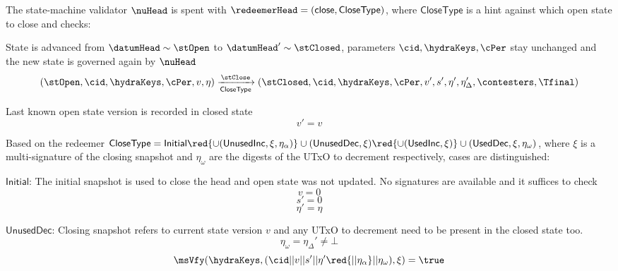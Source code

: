 \noindent The state-machine validator $\nuHead$ is spent with
$\redeemerHead = (\mathsf{close}, \mathsf{CloseType})$, where
$\mathsf{CloseType}$ is a hint against which open state to close and checks:
\begin{menumerate}
  \item State is advanced from $\datumHead \sim \stOpen$ to
  $\datumHead' \sim \stClosed$, parameters $\cid,\hydraKeys,\cPer$
  stay unchanged and the new state is governed again by $\nuHead$
  \[
	(\stOpen,\cid,\hydraKeys,\cPer,v,\eta) \xrightarrow[\mathsf{CloseType}]{\stClose} (\stClosed,\cid,\hydraKeys,\cPer,v',s',\eta', \eta_\Delta', \contesters,\Tfinal)
  \]
  \item Last known open state version is recorded in closed state
  \[
	v' = v
  \]

  \item Based on the redeemer $\mathsf{CloseType} = \mathsf{Initial} \red{\cup (\mathsf{UnusedInc}, \xi, \eta_\alpha)} \cup (\mathsf{UnusedDec}, \xi) \red{\cup (\mathsf{UsedInc}, \xi)}  \cup (\mathsf{UsedDec}, \xi, \eta_\omega) $, where $\xi$ is a multi-signature of the closing snapshot  and $\eta_\omega$ are the digests of the UTxO to  decrement respectively,  cases are distinguished:
  \begin{menumerate}
	\item $\mathsf{Initial}$: The initial snapshot is used to close the head and open state was not updated. No signatures are available and it suffices to check
	\[
	  v = 0
	\]
	\[
	  s' = 0
	\]
	\[
	  \eta' = \eta
	\]
	\item $\mathsf{UnusedDec}$: Closing snapshot refers to current state version $v$ and any UTxO to decrement need to be present in the closed state too.
	\[
	  \eta_\omega = \eta_\Delta' \neq \bot
	\]
	\red{
	  \[
		\eta_\alpha = \bot
	  \]
	}
	\[
	  \msVfy(\hydraKeys,(\cid || v || s' || \eta' \red{|| \eta_\alpha} || \eta_\omega),\xi) = \true
	\]
	\red{
}
\end{menumerate}
\end{menumerate}
